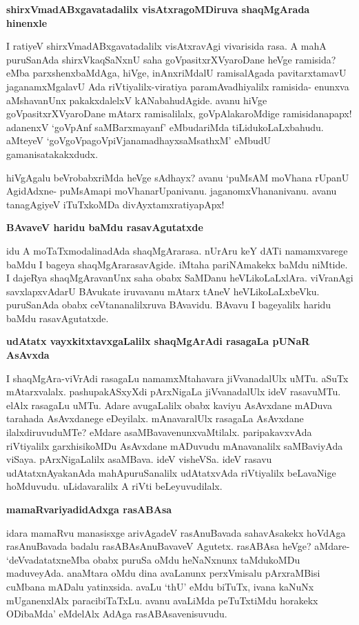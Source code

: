 {\bigskip
\noindent
{\large\bf shirxVmadABxgavatadalilx visAtxragoMDiruva shaqMgArada hinenxle}}
\medskip

\noindent
I ratiyeV shirxVmadABxgavatadalilx visAtxravAgi vivarisida rasa. A mahA puruSanAda shirxVkaqSaNxnU saha\- goVpasitxrXVyaroDane heVge ramisida? eMba parxshenxbaMdAga, hiVge, inAnxriMdalU ramisa\-lAgada pavitarx\-tamavU jaganamxMgalavU Ada riVtiyalilx-\break viratiya paramAvadhiyalilx ramisida- enunxva aMshavanUnx pakakxdalelxV kANabahu\-dAgide. avanu hiVge goVpasitxrXVyaroDane mAtarx ramisalilalx, goVpAlakaroMdige ramisidanapapx! adanenxV `goVpAnf saMBarxmayanf'\label{229} eMbudariMda tiLidukoLaLx\break\-bahudu. aMteyeV `goV\-goVpagoVpiVjanamadhayxsaMsathxM'\label{229} eMbudU gamanisa\-takakxdudx.

hiVgAgalu beVrobabxriMda heVge sAdhayx? avanu `puMsAM moVhana rUpanU AgidAdxne- puMsA\-mapi moVhanarUpanivanu. jaganomxVhananivanu. avanu tanagAgiyeV iTuTxkoMDa divAyxtamxratiyapApx!

{\bigskip
\noindent
{\large\bf BAvaveV haridu baMdu rasavAgutatxde}}\label{page229}
\medskip

\noindent
idu A moTaTxmodalinadAda shaqMgArarasa. nUrAru keY dATi namamxvarege baMdu I bageya shaqMgAra\-rasavAgide. iMtaha pariNAmakekx baMdu niMtide. I dajeRya shaqMgAravanUnx saha obabx SaMDanu heVLikoLaLxlAra. viVranAgi savxlapxvAdarU BAvukate iruvavanu mAtarx tAneV heVLikoLaLxbeVku. puruSa\-nAda obabx ceVtananalilxruva BAvavidu. BAvavu I bageyalilx haridu baMdu rasavAgutatxde.

{\bigskip
\noindent
{\large\bf udAtatx vayxkitxtavxgaLalilx shaqMgArAdi rasagaLa pUNaR AsAvxda}}
\medskip

\noindent
I shaqMgAra-viVrAdi rasagaLu namamxMtahavara jiVvanadalUlx uMTu. aSuTx mAtarxvalalx. pashupa\-kASxyXdi pArxNigaLa jiVvanadalUlx ideV rasavuMTu. elAlx rasagaLu uMTu. Adare avugaLalilx obabx kaviyu AsAvx\-dane mADuva tarahada AsAvxdanege eDeyilalx. mAnavaralUlx rasagaLa AsAvxdane ilalxdiruvuduMTe? eMdare asaMBavavenunxvaMtilalx. paripakavxvAda riVtiyalilx garxhisikoMDu AsAvxdane mADuvudu mAnava\-nalilx saMBaviyAda viSaya. pArxNigaLalilx asaMBava. ideV visheVSa. ideV rasavu udAtatxnAyakanAda mahA\-puruSanalilx udAtatxvAda riVtiyalilx beLavaNige hoMduvudu. uLidavaralilx A riVti beLeyuvu\-dilalx.

{\bigskip
\noindent
{\large\bf mamaRvariyadidAdxga rasABAsa}}\label{page229}
\medskip

\noindent
idara mamaRvu manasisxge arivAgadeV rasAnuBavada sahavAsakekx hoVdAga rasAnuBavada badalu rasABAsAnuBavaveV Agutetx. rasABAsa heVge? aMdare- `deVvadatatxneMba obabx puruSa oMdu heNaNxnunx taMdukoMDu maduveyAda. anaMtara oMdu dina avaLanunx perxVmisalu pArxraMBisi cuMbana mADalu yatinxsida. avaLu `thU' eMdu biTuTx, ivana kaNuNx mUganenxlAlx paracibiTaTxLu. avanu avaLiMda peTuTx\-tiMdu horakekx ODibaMda' eMdelAlx AdAga rasABAsavenisuvudu.

